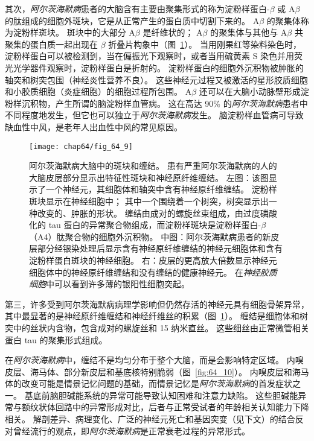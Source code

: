 其次，\textit{阿尔茨海默病}患者的大脑含有主要由聚集形式的称为淀粉样蛋白-$\beta$ 或 A$\beta$ 的肽组成的细胞外斑块，它是从正常产生的蛋白质中切割下来的。
A$\beta$ 的聚集体称为淀粉样斑块。
斑块中的大部分 A$\beta$ 是纤维状的；
A$\beta$ 的聚集体与其他与 A$\beta$ 共聚集的蛋白质一起出现在 $\beta$ 折叠片构象中（图~\ref{fig:64_9}）。
当用刚果红等染料染色时，淀粉样蛋白可以被检测到，当在偏振光下观察时，或者当用硫黄素 S 染色并用荧光光学器件观察时，淀粉样蛋白是折射的。
淀粉样蛋白的细胞外沉积物被肿胀的轴突和树突包围（神经炎性营养不良）。
这些神经元过程又被激活的星形胶质细胞和小胶质细胞（炎症细胞）的细胞过程所包围。
A$\beta$ 还可以在大脑小动脉壁形成淀粉样沉积物，产生所谓的脑淀粉样血管病。
这在高达 90\% 的\textit{阿尔茨海默病}患者中不同程度地发生，但它也可以独立于\textit{阿尔茨海默病}发生。
脑淀粉样血管病可导致缺血性中风，是老年人出血性中风的常见原因。


\begin{figure}[htbp]
	\centering
	\texttt{[image: chap64/fig\_64\_9]}
	\caption{阿尔茨海默病大脑中的斑块和缠结。
		患有严重阿尔茨海默病的人的大脑皮层部分显示出特征性斑块和神经原纤维缠结。
		左图：该图显示了一个神经元，其细胞体和轴突中含有神经原纤维缠结。
		淀粉样斑块显示在神经细胞中；
		其中一个围绕着一个树突，树突显示出一种改变的、肿胀的形状。
		缠结由成对的螺旋丝束组成，由过度磷酸化的 tau 蛋白的异常聚合物组成，而淀粉样斑块是淀粉样蛋白-$\beta$（A4）肽聚合物的细胞外沉积物。
		中图：阿尔茨海默病患者的新皮层部分经银染处理后显示含有神经原纤维缠结的神经元细胞体和含有淀粉样蛋白斑块的神经细胞。
		右：皮层的更高放大倍数显示神经元细胞体中的神经原纤维缠结和没有缠结的健康神经元。
		在\textit{神经胶质细胞}中可以看到许多薄的银阳性细胞突起。}
	\label{fig:64_9}
\end{figure}


第三，许多受到阿尔茨海默病病理学影响但仍然存活的神经元具有细胞骨架异常，其中最显著的是神经原纤维缠结和神经纤维丝的积累（图~\ref{fig:64_9}）。
缠结是细胞体和树突中的丝状内含物，包含成对的螺旋丝和 15 纳米直丝。
这些细丝由正常微管相关蛋白 tau 的聚集形式组成。


在\textit{阿尔茨海默病}中，缠结不是均匀分布于整个大脑，而是会影响特定区域。
内嗅皮层、海马体、部分新皮层和基底核特别脆弱（图~\ref{fig:64_10}）。
内嗅皮层和海马体的改变可能是情景记忆问题的基础，而情景记忆是\textit{阿尔茨海默病}的首发症状之一。
基底前脑胆碱能系统的异常可能导致认知困难和注意力缺陷。
这些胆碱能异常与额纹状体回路中的异常形成对比，后者与正常受试者的年龄相关认知能力下降相关。
解剖差异、病理变化、广泛的神经元死亡和基因突变（见下文）的结合反对曾经流行的观点，即\textit{阿尔茨海默病}是正常衰老过程的异常形式。


